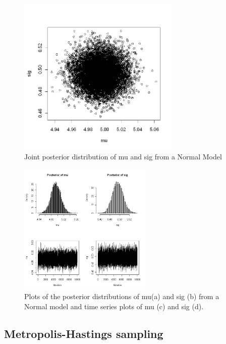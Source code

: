 \begin{figure}
\begin{center}
\includegraphics[height=3in]{Ch6/figs/postdist}
\end{center}
\caption{Joint posterior distribution of mu and sig from a Normal Model}
\label{postdist.fig}
\end{figure}

\begin{figure}
\begin{center}
\includegraphics[width=2.5in]{Ch6/figs/plotsofPD}
\end{center}
\caption{Plots of the posterior distributions of mu(a) and sig (b)
  from a Normal model and time series plots of mu (c) and sig (d).}
\label{plotsofPD.fig}
\end{figure}

\subsection{ Metropolis-Hastings sampling   }


